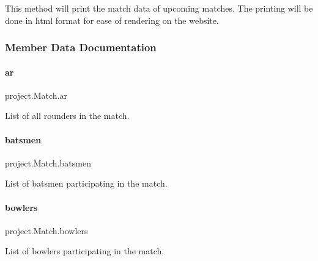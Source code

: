 \begin{DoxyVerb}This method will print the match data of upcoming matches. The printing will be done in html format for ease of rendering on the website.\end{DoxyVerb}
 

\subsubsection{Member Data Documentation}
\mbox{\label{classproject_1_1Match_a6179b09b7054234d1a6f248a60f9e7f8}} 
\paragraph{\texorpdfstring{ar}{ar}}
{\footnotesize\ttfamily project.\+Match.\+ar}



List of all rounders in the match. 

\mbox{\label{classproject_1_1Match_a439f5a30383147cc4f0d3ef0fc65e57b}} 
\paragraph{\texorpdfstring{batsmen}{batsmen}}
{\footnotesize\ttfamily project.\+Match.\+batsmen}



List of batsmen participating in the match. 

\mbox{\label{classproject_1_1Match_a72f5836dc303871b4d19b44895b8f012}} 
\paragraph{\texorpdfstring{bowlers}{bowlers}}
{\footnotesize\ttfamily project.\+Match.\+bowlers}



List of bowlers participating in the match. 

\mbox{\label{classproject_1_1Match_a76c2df132c697094719f0d7450994811}} 
